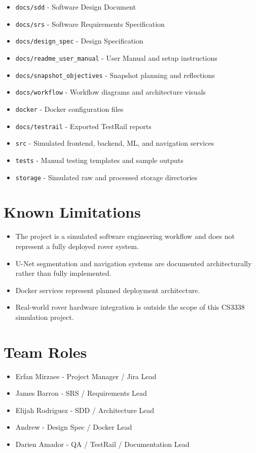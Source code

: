 \documentclass{article}
\begin{document}
\begin{itemize}
    \item \texttt{docs/sdd} - Software Design Document
    \item \texttt{docs/srs} - Software Requirements Specification
    \item \texttt{docs/design\_spec} - Design Specification
    \item \texttt{docs/readme\_user\_manual} - User Manual and setup instructions
    \item \texttt{docs/snapshot\_objectives} - Snapshot planning and reflections
    \item \texttt{docs/workflow} - Workflow diagrams and architecture visuals
    \item \texttt{docker} - Docker configuration files
    \item \texttt{docs/testrail} - Exported TestRail reports
    \item \texttt{src} - Simulated frontend, backend, ML, and navigation services
    \item \texttt{tests} - Manual testing templates and sample outputs
    \item \texttt{storage} - Simulated raw and processed storage directories
\end{itemize}

\section{Known Limitations}

\begin{itemize}
    \item The project is a simulated software engineering workflow and does not represent a fully deployed rover system.
    \item U-Net segmentation and navigation systems are documented architecturally rather than fully implemented.
    \item Docker services represent planned deployment architecture.
    \item Real-world rover hardware integration is outside the scope of this CS3338 simulation project.
\end{itemize}

\section{Team Roles}

\begin{itemize}
    \item Erfan Mirzaee - Project Manager / Jira Lead
    \item James Barron - SRS / Requirements Lead
    \item Elijah Rodriguez - SDD / Architecture Lead
    \item Andrew - Design Spec / Docker Lead
    \item Darien Amador - QA / TestRail / Documentation Lead
\end{itemize}
\end{document}
